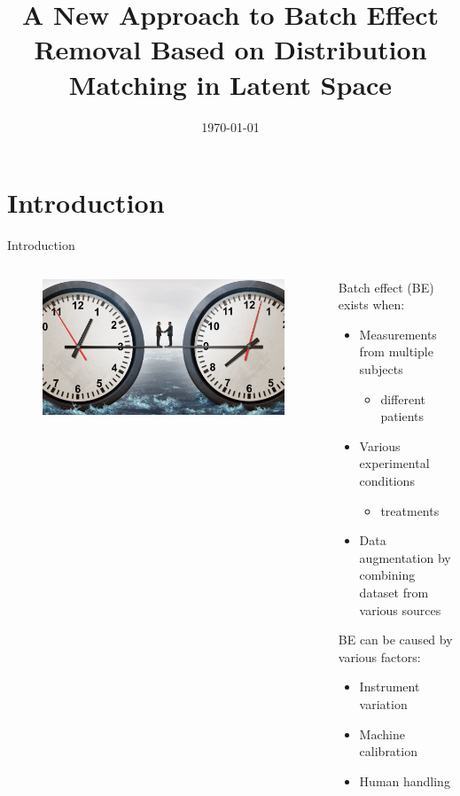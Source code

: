\documentclass{beamer}
\title[DLBR]{A New Approach to Batch Effect Removal Based on Distribution Matching in Latent Space}
\author[Dogan]
{%
	\texorpdfstring{
		\begin{columns}
			\column{.85\linewidth}
			\centering
			Huaqing Li, Haluk Dogan, and Juan Cui$^{*}$
		\end{columns}
	}
	{Dogan}
}
\institute[UNL] %
{
  Systems Biology and Biomedical Informatics Laboratory\\
  \url{https://sbbi.unl.edu/}\\\vspace{1cm}
  Department of Computer Science and Engineering\\
  University of Nebraska-Lincoln
}
\date[\today] %
{\today}
\begin{document}
\begin{frame}
  \titlepage{}
\end{frame}

\section{Introduction}
\begin{frame}{Introduction}
  \begin{columns}
	\begin{column}{.55\textwidth}
	  \begin{figure}[ht]
		\centering
		\includegraphics[width=1.0\textwidth,height=0.8\textheight]{figures/carrot.jpeg}
		\caption*{\label{fig:label} }
	  \end{figure}

	\end{column}

	\begin{column}{.43\textwidth}
	  {\footnotesize
	  Batch effect (BE) exists when:
	  \begin{itemize}
		\item Measurements from multiple subjects
		  \begin{itemize}
			  \item different patients
		  \end{itemize}
		\item Various experimental conditions
		  \begin{itemize}
			  \item treatments
		  \end{itemize}
		\item Data augmentation by combining dataset from various sources
	  \end{itemize}
	BE can be caused by various factors:
	\begin{itemize}
	  \item Instrument variation
	  \item Machine calibration
	  \item Human handling
	\end{itemize}
  }
	\end{column}
  \end{columns}
\end{frame}
\end{document}

